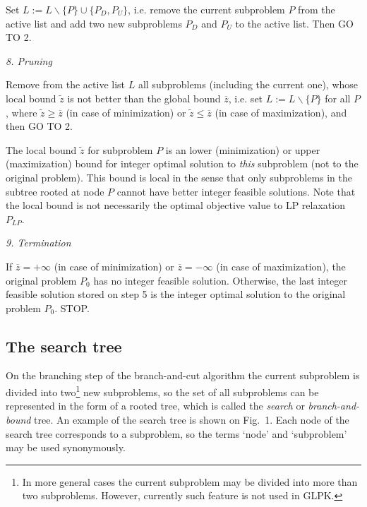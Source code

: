 Set $L:=L\backslash\{P\}\cup\{P_D,P_U\}$, i.e. remove the current
subproblem $P$ from the active list and add two new subproblems $P_D$
and $P_U$ to the active list. Then GO TO 2.

\medskip

{\it 8. Pruning}

Remove from the active list $L$ all subproblems (including the current
one), whose local bound $\widetilde{z}$ is not better than the global
bound $\overline{z}$, i.e. set $L:=L\backslash\{P\}$ for all $P$, where
$\widetilde{z}\geq\overline{z}$ (in case of minimization) or
$\widetilde{z}\leq\overline{z}$ (in case of maximization), and then
GO TO 2.

The local bound $\widetilde{z}$ for subproblem $P$ is an lower
(minimization) or upper (maximization) bound for integer optimal
solution to {\it this} subproblem (not to the original problem). This
bound is local in the sense that only subproblems in the subtree rooted
at node $P$ cannot have better integer feasible solutions. Note that
the local bound is not necessarily the optimal objective value to LP
relaxation $P_{LP}$.

\medskip

{\it 9. Termination}

If $\overline{z}=+\infty$ (in case of minimization) or
$\overline{z}=-\infty$ (in case of maximization), the original problem
$P_0$ has no integer feasible solution. Otherwise, the last integer
feasible solution stored on step 5 is the integer optimal solution to
the original problem $P_0$. STOP.

\subsection{The search tree}

On the branching step of the branch-and-cut algorithm the current
subproblem is divided into two\footnote{In more general cases the
current subproblem may be divided into more than two subproblems.
However, currently such feature is not used in GLPK.} new subproblems,
so the set of all subproblems can be represented in the form of a rooted
tree, which is called the {\it search} or {\it branch-and-bound} tree.
An example of the search tree is shown on Fig.~1. Each node of the
search tree corresponds to a subproblem, so the terms `node' and
`subproblem' may be used synonymously.

\newpage

\setlength{\unitlength}{1mm}

